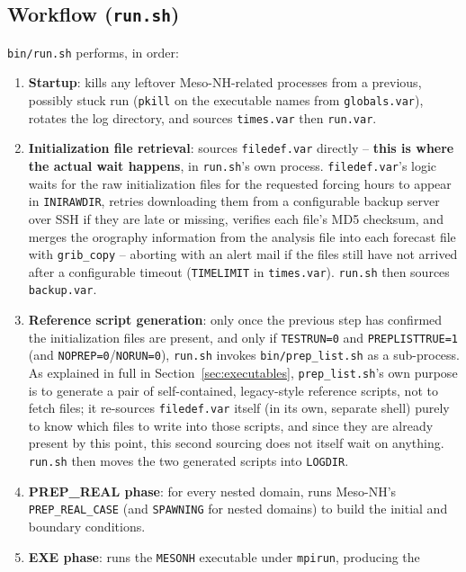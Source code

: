 \subsection{Workflow (\texttt{run.sh})}
\texttt{bin/run.sh} performs, in order:
\begin{enumerate}
  \item \textbf{Startup}: kills any leftover Meso-NH-related processes from a previous, possibly stuck
        run (\texttt{pkill} on the executable names from \texttt{globals.var}), rotates the log
        directory, and sources \texttt{times.var} then \texttt{run.var}.
  \item \textbf{Initialization file retrieval}: sources \texttt{filedef.var} directly -- \textbf{this is
        where the actual wait happens}, in \texttt{run.sh}'s own process. \texttt{filedef.var}'s logic
        waits for the raw initialization files for the requested forcing hours to appear in
        \texttt{INIRAWDIR}, retries downloading them from a configurable backup server over SSH if they
        are late or missing, verifies each file's MD5 checksum, and merges the orography information
        from the analysis file into each forecast file with \texttt{grib\_copy} -- aborting with an
        alert mail if the files still have not arrived after a configurable timeout (\texttt{TIMELIMIT}
        in \texttt{times.var}). \texttt{run.sh} then sources \texttt{backup.var}.
  \item \textbf{Reference script generation}: only once the previous step has confirmed the
        initialization files are present, and only if \texttt{TESTRUN=0} and \texttt{PREPLISTTRUE=1}
        (and \texttt{NOPREP=0}\slash\texttt{NORUN=0}), \texttt{run.sh} invokes \texttt{bin/prep\_list.sh} as
        a sub-process. As explained in full in Section~\ref{sec:executables},
        \texttt{prep\_list.sh}'s own purpose is to generate a pair of self-contained, legacy-style
        reference scripts, not to fetch files; it re-sources \texttt{filedef.var} itself (in its own,
        separate shell) purely to know which files to write into those scripts, and since they are
        already present by this point, this second sourcing does not itself wait on anything.
        \texttt{run.sh} then moves the two generated scripts into \texttt{LOGDIR}.
  \item \textbf{PREP\_REAL phase}: for every nested domain, runs Meso-NH's \texttt{PREP\_REAL\_CASE}
        (and \texttt{SPAWNING} for nested domains) to build the initial and boundary conditions.
  \item \textbf{EXE phase}: runs the \texttt{MESONH} executable under \texttt{mpirun}, producing the

\end{enumerate}

